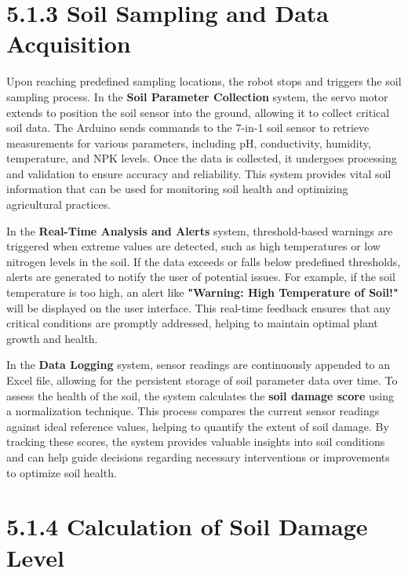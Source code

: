 \documentclass{book} %
\begin{document}
\noindent 
\section{5.1.3 Soil Sampling and Data Acquisition}

\noindent Upon reaching predefined sampling locations, the robot stops and triggers the soil sampling process. In the \textbf{Soil Parameter Collection} system, the servo motor extends to position the soil sensor into the ground, allowing it to collect critical soil data. The Arduino sends commands to the 7-in-1 soil sensor to retrieve measurements for various parameters, including pH, conductivity, humidity, temperature, and NPK levels. Once the data is collected, it undergoes processing and validation to ensure accuracy and reliability. This system provides vital soil information that can be used for monitoring soil health and optimizing agricultural practices.

\noindent 

\noindent In the \textbf{Real-Time Analysis and Alerts} system, threshold-based warnings are triggered when extreme values are detected, such as high temperatures or low nitrogen levels in the soil. If the data exceeds or falls below predefined thresholds, alerts are generated to notify the user of potential issues. For example, if the soil temperature is too high, an alert like \textbf{"Warning: High Temperature of Soil!"} will be displayed on the user interface. This real-time feedback ensures that any critical conditions are promptly addressed, helping to maintain optimal plant growth and health.

\noindent \textbf{}

\noindent In the \textbf{Data Logging} system, sensor readings are continuously appended to an Excel file, allowing for the persistent storage of soil parameter data over time. To assess the health of the soil, the system calculates the \textbf{soil damage score} using a normalization technique. This process compares the current sensor readings against ideal reference values, helping to quantify the extent of soil damage. By tracking these scores, the system provides valuable insights into soil conditions and can help guide decisions regarding necessary interventions or improvements to optimize soil health.\textbf{}

\noindent 
\section{5.1.4 Calculation of Soil Damage Level}
\end{document}
